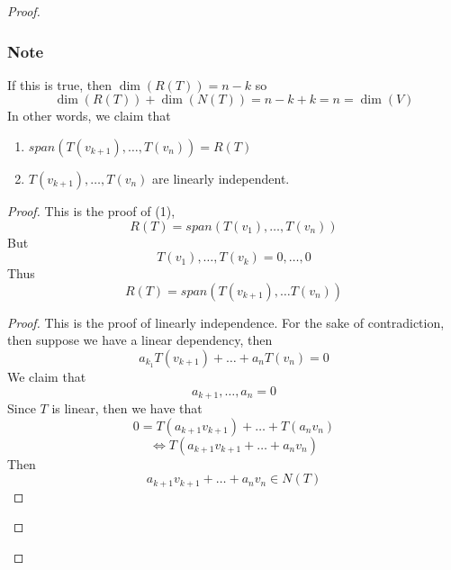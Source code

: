 \documentclass{article}
\newtheorem{one minute paper}[theorem]{One Minute Paper}
\begin{document}
\begin{proof}
    \subsubsection*{Note}
    If this is true, then $\dim(R(T)) = n-k$ so 
    \begin{equation}
        \dim(R(T)) + \dim(N(T)) = n-k + k = n = \dim(V)
    \end{equation}
    In other words, we claim that 
    \begin{enumerate}
        \item $span(T(v_{k+1}), \dots, T(v_n)) = R(T)$
        \item $T(v_{k+1}), \dots, T(v_n)$ are linearly independent. 
    \end{enumerate}
    \begin{proof}
        This is the proof of (1), 
        \begin{equation}
            R(T) = span(T(v_1), \dots, T(v_n))
        \end{equation}
        But 
        \begin{equation}
            T(v_1), \dots, T(v_k) = 0, \dots, 0
        \end{equation}
        Thus 
        \begin{equation}
            R(T) = span(T(v_{k+1}), \dots T(v_n))
        \end{equation}
        \begin{proof}
            This is the proof of linearly independence. For the sake of contradiction, then suppose we have a linear dependency, then 
            \begin{equation}
                a_{k_1}T(v_{k+1}) + \dots + a_nT(v_n) = 0
            \end{equation}
            We claim that 
            \begin{equation}
                a_{k+1}, \dots, a_n = 0
            \end{equation}
            Since $T$ is linear, then we have that 
            \begin{equation}
                0 = T(a_{k+1}v_{k+1}) + \dots + T(a_nv_n) 
            \end{equation}
            \begin{equation}
                \iff T(a_{k+1}v_{k+1} + \dots + a_nv_n)
            \end{equation}
            Then 
            \begin{equation}
                a_{k+1}v_{k+1} + \dots + a_nv_n \in N(T)
            \end{equation}

\end{proof}
\end{proof}
\end{proof}
\end{document}
